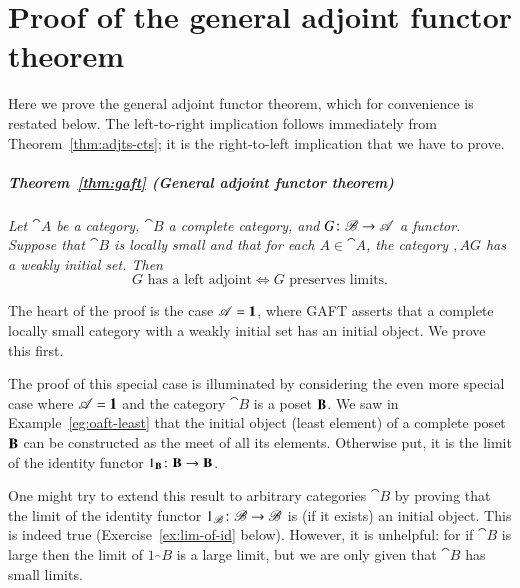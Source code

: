 % 
% 
% 

\chapter{Proof of the general adjoint functor theorem}
%
%
%

Here we prove the general adjoint functor theorem, which for convenience is
restated below.  The left-to-right implication follows immediately from
Theorem~\ref{thm:adjts-cts}; it is the right-to-left implication that we
have to prove.

\paragraph*{\upshape Theorem~\ref{thm:gaft} (General adjoint functor theorem)} 
{\itshape
Let $\cat{A}$ be a category, $\cat{B}$ a complete category, and $G\from
\cat{B} \to \cat{A}$ a functor.  Suppose that $\cat{B}$ is locally small and
that for each $A \in \cat{A}$, the category $\comma{A}{G}$ has a weakly%
%
%
%
initial set.  Then
\[
G \text{ has a left adjoint}
\iff
G \text{ preserves limits}.
\]
}

The heart of the proof is the case $\mathscr{A} = \mathbf{1}$, where GAFT asserts
that a complete locally small category with a weakly initial set has an
initial object.  We prove this first.

The proof of this special case is illuminated by considering the even more
special case where $\mathscr{A} = \mathbf{1}$ and the category $\cat{B}$ is a poset
$\mathbf{B}$.  We saw in Example~\ref{eg:oaft-least} that the initial object
(least%
%
%
element) of a complete poset $\mathbf{B}$ can be constructed as the meet of
all its elements.  Otherwise put, it is the limit of the identity functor
$1_\scat{B}\from \scat{B} \to \scat{B}$.

One might try to extend this result to arbitrary categories $\cat{B}$ by
proving that the limit of the identity%
%
%
%
%
functor $1_\cat{B}\from \cat{B} \to \cat{B}$ is (if it exists) an initial
object.  This is indeed true (Exercise~\ref{ex:lim-of-id} below).  However,
it is unhelpful: for if $\cat{B}$ is large then the limit of $1_\cat{B}$
is a large%
%
%
limit, but we are only given that $\cat{B}$ has small limits.


